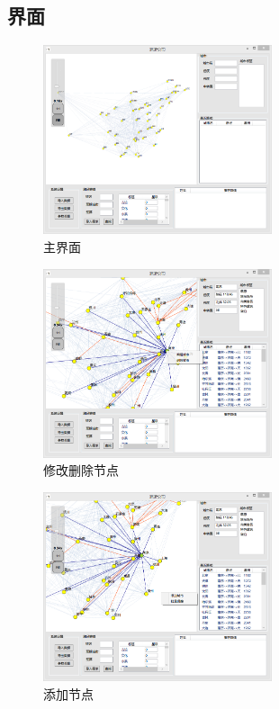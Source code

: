 \documentclass[12pt,a4paper]{article}
\begin{document}
\subsection{界面}
\begin{figure}[H]
\centering
\includegraphics[width=0.6\textwidth]{1.png}
\caption{主界面} 
\end{figure}
\begin{figure}[H]
\centering
\includegraphics[width=0.6\textwidth]{2.png}
\caption{修改删除节点} 
\end{figure}
\begin{figure}[H]
\centering
\includegraphics[width=0.6\textwidth]{3.png}
\caption{添加节点} 
\end{figure}
\end{document}
